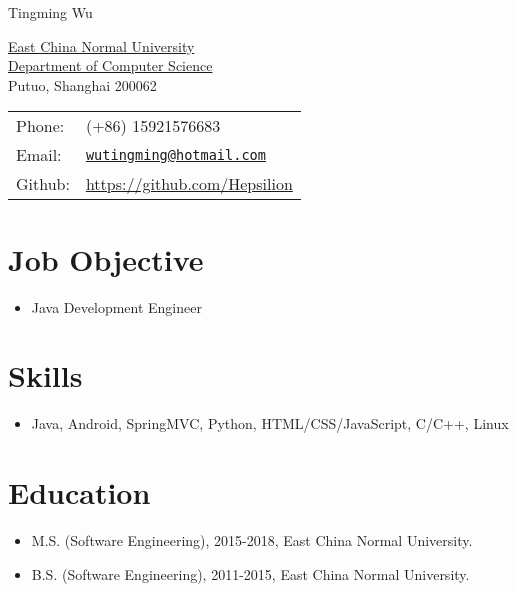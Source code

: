 \documentclass[letterpaper, UTF8]{article}
\def\name{Tingming Wu}
\begin{document}
	
	{\huge \name}
	
	
	\vspace{0.15in}  %
	
	\begin{minipage}{0.45\linewidth}
		\href{http://www.ecnu.edu.cn/}{East China Normal University} \\
		\href{http://www.sei.ecnu.edu.cn}{Department of Computer Science}  \\
		Putuo, Shanghai 200062
	\end{minipage}
	\begin{minipage}{0.45\linewidth}
		\begin{tabular}{ll}
			Phone: & (+86) 15921576683 \\
			Email: & \href{mailto:wutingming@hotmail.com}{\tt wutingming@hotmail.com} \\
			Github: &  \href{https://github.com/Hepsilion}{https://github.com/Hepsilion}\\
		\end{tabular}
	\end{minipage}
	\vspace{-0.1in}
	
	\section*{\textbf{Job Objective}}\vspace{-0.05in}
	\begin{itemize}
		\item Java Development Engineer
	\end{itemize}
	\vspace{-0.25in}
	
	\section*{\textbf{Skills}}\vspace{-0.05in}
	\begin{itemize}
		\item Java, Android, SpringMVC, Python, HTML/CSS/JavaScript, C/C++, Linux
	\end{itemize}
	\vspace{-0.32in}
	
	\section*{\textbf{Education}}\vspace{-0.05in}
	\begin{itemize}
		\item M.S. (Software Engineering), 2015-2018, East China Normal University.
		\item B.S. (Software Engineering), 2011-2015, East China Normal University.
	\end{itemize}	
	\vspace{-0.32in}
	
\end{document}
